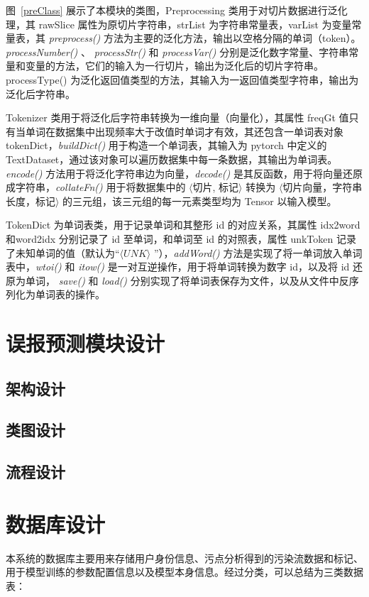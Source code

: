 图~\ref{preClass} 展示了本模块的类图，Preprocessing 类用于对切片数据进行泛化理，其 rawSlice 属性为原切片字符串，strList 为字符串常量表，varList 为变量常量表，其 \textit{preprocess()} 方法为主要的泛化方法，输出以空格分隔的单词（token）。\textit{processNumber()} 、 \textit{processStr()} 和 \textit{processVar()} 分别是泛化数字常量、字符串常量和变量的方法，它们的输入为一行切片，输出为泛化后的切片字符串。processType() 为泛化返回值类型的方法，其输入为一返回值类型字符串，输出为泛化后字符串。

Tokenizer 类用于将泛化后字符串转换为一维向量（向量化），其属性 freqGt 值只有当单词在数据集中出现频率大于改值时单词才有效，其还包含一单词表对象 tokenDict，\textit{buildDict()} 用于构造一个单词表，其输入为 pytorch 中定义的TextDataset，通过该对象可以遍历数据集中每一条数据，其输出为单词表。\textit{encode()} 方法用于将泛化字符串边为向量，\textit{decode()} 是其反函数，用于将向量还原成字符串，\textit{collateFn()} 用于将数据集中的 $\langle$切片, 标记$\rangle$ 转换为 $\langle$切片向量，字符串长度，标记$\rangle$ 的三元组，该三元组的每一元素类型均为 Tensor 以输入模型。

TokenDict 为单词表类，用于记录单词和其整形 id 的对应关系，其属性 idx2word 和word2idx 分别记录了 id 至单词，和单词至 id 的对照表，属性 unkToken 记录了未知单词的值（默认为“$\langle UNK \rangle$ ”），\textit{addWord()} 方法是实现了将一单词放入单词表中，\textit{wtoi()} 和 \textit{itow()} 是一对互逆操作，用于将单词转换为数字 id，以及将 id 还原为单词， \textit{save()} 和 \textit{load()} 分别实现了将单词表保存为文件，以及从文件中反序列化为单词表的操作。

\section{误报预测模块设计}
\subsection{架构设计}
\subsection{类图设计}
\subsection{流程设计}

\section{数据库设计}
本系统的数据库主要用来存储用户身份信息、污点分析得到的污染流数据和标记、用于模型训练的参数配置信息以及模型本身信息。经过分类，可以总结为三类数据表：

